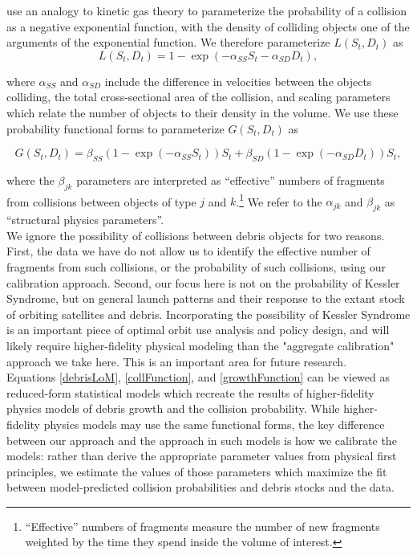 \documentclass[12pt]{article}
\begin{document}
\cite{letiziaetal2017} use an analogy to kinetic gas theory to parameterize the probability of a collision as a negative exponential function, with the density of colliding objects one of the arguments of the exponential function. We therefore parameterize $L(S_t,D_t)$ as
\begin{equation}
\label{collFunction}
L(S_t,D_t) = 1 - \exp(-\alpha_{SS}S_t - \alpha_{SD}D_t),
\end{equation}

where $\alpha_{SS}$ and $\alpha_{SD}$ include the difference in velocities between the objects colliding, the total cross-sectional area of the collision, and scaling parameters which relate the number of objects to their density in the volume. We use these probability functional forms to parameterize $G(S_t,D_t)$ as

\begin{equation}
\label{growthFunction}
G(S_t,D_t) = \beta_{SS} (1 - \exp(-\alpha_{SS}S_t))S_t + \beta_{SD} (1 - \exp(-\alpha_{SD}D_t))S_t,
\end{equation}

where the $\beta_{jk}$ parameters are interpreted as ``effective'' numbers of fragments from collisions between objects of type $j$ and $k$.\footnote{``Effective'' numbers of fragments measure the number of new fragments weighted by the time they spend inside the volume of interest.} We refer to the $\alpha_{jk}$ and $\beta_{jk}$ as ``structural physics parameters''.\\ 

We ignore the possibility of collisions between debris objects for two reasons. First, the data we have do not allow us to identify the effective number of fragments from such collisions, or the probability of such collisions, using our calibration approach. Second, our focus here is not on the probability of Kessler Syndrome, but on general launch patterns and their response to the extant stock of orbiting satellites and debris. Incorporating the possibility of Kessler Syndrome is an important piece of optimal orbit use analysis and policy design, and will likely require higher-fidelity physical modeling than the "aggregate calibration" approach we take here. This is an important area for future research.\\

Equations \ref{debrisLoM}, \ref{collFunction}, and \ref{growthFunction} can be viewed as reduced-form statistical models which recreate the results of higher-fidelity physics models of debris growth and the collision probability. While higher-fidelity physics models may use the same functional forms, the key difference between our approach and the approach in such models is how we calibrate the models: rather than derive the appropriate parameter values from physical first principles, we estimate the values of those parameters which maximize the fit between model-predicted collision probabilities and debris stocks and the data.
\end{document}
